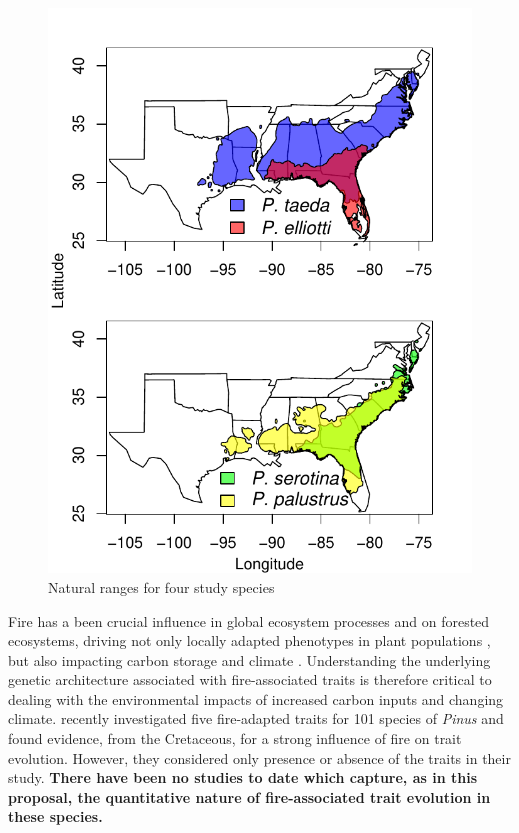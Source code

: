 \begin{figure}
\vspace{-30pt}
\centering
\includegraphics[scale=0.7]{rangemap}
\caption{Natural ranges for four study species}
\label{f:range}
\vspace{-10pt}
\end{figure}


Fire has a been crucial influence in global ecosystem processes and on forested ecosystems, driving not only locally 
adapted phenotypes in plant populations \citep{Lamont:1991js,Vega:2008vk,Midgley:2011dw,Keeley:2011jw,
He:2012bz,Parchman:2012ca}, but also impacting carbon storage and climate \citep{Bowman:2009kp}.  
Understanding the underlying genetic architecture 
associated with fire-associated traits is therefore critical to dealing with the environmental impacts of increased carbon inputs and 
changing climate.  \citet{He:2012bz} recently investigated five fire-adapted traits for 101 species of \emph{Pinus} and found evidence, 
from the Cretaceous, for a strong influence of fire on trait evolution.  However, they considered only presence or absence of the traits in 
their study.  \textbf{There have been no studies to date which capture, as in this proposal, the quantitative nature of fire-associated trait 
evolution in these species.} 

